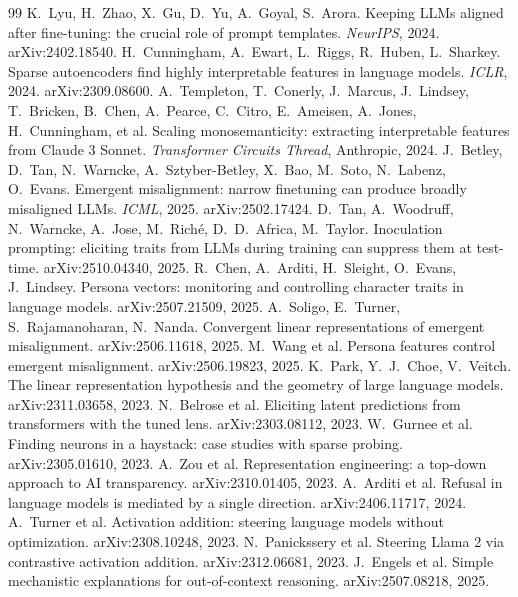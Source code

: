 \documentclass[11pt]{article}
\theoremstyle{definition}
\theoremstyle{definition}
\theoremstyle{assumptionstyle}
\newcounter{prediction}
\begin{document}
\begin{thebibliography}{99}\footnotesize
{} K.~Lyu, H.~Zhao, X.~Gu, D.~Yu, A.~Goyal, S.~Arora. Keeping LLMs aligned after fine-tuning: the crucial role of prompt templates. \emph{NeurIPS}, 2024. arXiv:2402.18540.
 H.~Cunningham, A.~Ewart, L.~Riggs, R.~Huben, L.~Sharkey. Sparse autoencoders find highly interpretable features in language models. \emph{ICLR}, 2024. arXiv:2309.08600.
 A.~Templeton, T.~Conerly, J.~Marcus, J.~Lindsey, T.~Bricken, B.~Chen, A.~Pearce, C.~Citro, E.~Ameisen, A.~Jones, H.~Cunningham, et al. Scaling monosemanticity: extracting interpretable features from Claude 3 Sonnet. \emph{Transformer Circuits Thread}, Anthropic, 2024.
 J.~Betley, D.~Tan, N.~Warncke, A.~Sztyber-Betley, X.~Bao, M.~Soto, N.~Labenz, O.~Evans. Emergent misalignment: narrow finetuning can produce broadly misaligned LLMs. \emph{ICML}, 2025. arXiv:2502.17424.
 D.~Tan, A.~Woodruff, N.~Warncke, A.~Jose, M.~Rich\'e, D.~D.~Africa, M.~Taylor. Inoculation prompting: eliciting traits from LLMs during training can suppress them at test-time. arXiv:2510.04340, 2025.
 R.~Chen, A.~Arditi, H.~Sleight, O.~Evans, J.~Lindsey. Persona vectors: monitoring and controlling character traits in language models. arXiv:2507.21509, 2025.
 A.~Soligo, E.~Turner, S.~Rajamanoharan, N.~Nanda. Convergent linear representations of emergent misalignment. arXiv:2506.11618, 2025.
 M.~Wang et al. Persona features control emergent misalignment. arXiv:2506.19823, 2025.
 K.~Park, Y.~J.~Choe, V.~Veitch. The linear representation hypothesis and the geometry of large language models. arXiv:2311.03658, 2023.
 N.~Belrose et al. Eliciting latent predictions from transformers with the tuned lens. arXiv:2303.08112, 2023.
 W.~Gurnee et al. Finding neurons in a haystack: case studies with sparse probing. arXiv:2305.01610, 2023.
 A.~Zou et al. Representation engineering: a top-down approach to AI transparency. arXiv:2310.01405, 2023.
 A.~Arditi et al. Refusal in language models is mediated by a single direction. arXiv:2406.11717, 2024.
 A.~Turner et al. Activation addition: steering language models without optimization. arXiv:2308.10248, 2023.
 N.~Panickssery et al. Steering Llama 2 via contrastive activation addition. arXiv:2312.06681, 2023.
 J.~Engels et al. Simple mechanistic explanations for out-of-context reasoning. arXiv:2507.08218, 2025.

\end{thebibliography}
\end{document}
